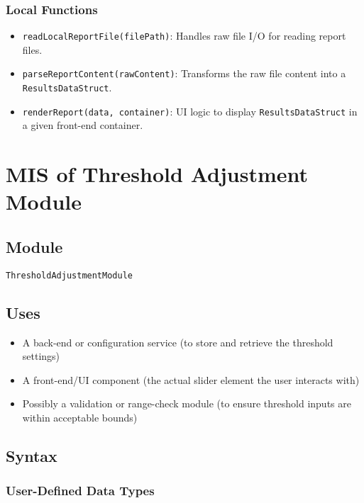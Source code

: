 \documentclass[12pt, titlepage]{article}
\begin{document}
\subsubsection{Local Functions}

\begin{itemize}
    \item \texttt{readLocalReportFile(filePath)}: Handles raw file I/O for reading report files.
    \item \texttt{parseReportContent(rawContent)}: Transforms the raw file content into a \texttt{ResultsDataStruct}.
    \item \texttt{renderReport(data, container)}: UI logic to display \texttt{ResultsDataStruct} in a given front-end container.
\end{itemize}

\section{MIS of Threshold Adjustment Module} \label{mThreshold}


\subsection{Module}

\texttt{ThresholdAdjustmentModule}

\subsection{Uses}

\begin{itemize}
    \item A back-end or configuration service (to store and retrieve the threshold settings)
    \item A front-end/UI component (the actual slider element the user interacts with)
    \item Possibly a validation or range-check module (to ensure threshold inputs are within acceptable bounds)
\end{itemize}

\subsection{Syntax}

\subsubsection{User-Defined Data Types}
\end{document}
